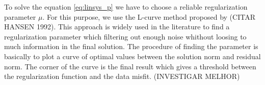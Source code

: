 To solve the equation \ref{eq:linsys_p} we have to choose a reliable regularization parameter $\mu$. For this purpose, we use the L-curve method proposed by (CITAR HANSEN 1992). This approach is widely used in the literature to find a regularization parameter which filtering out enough noise whithout loosing to much information in the final solution. The procedure of finding the parameter is basically to plot a curve of optimal values between the solution norm and residual norm. The corner of the curve is the final result which gives a threshold between the regularization function and the data misfit. (INVESTIGAR MELHOR)
